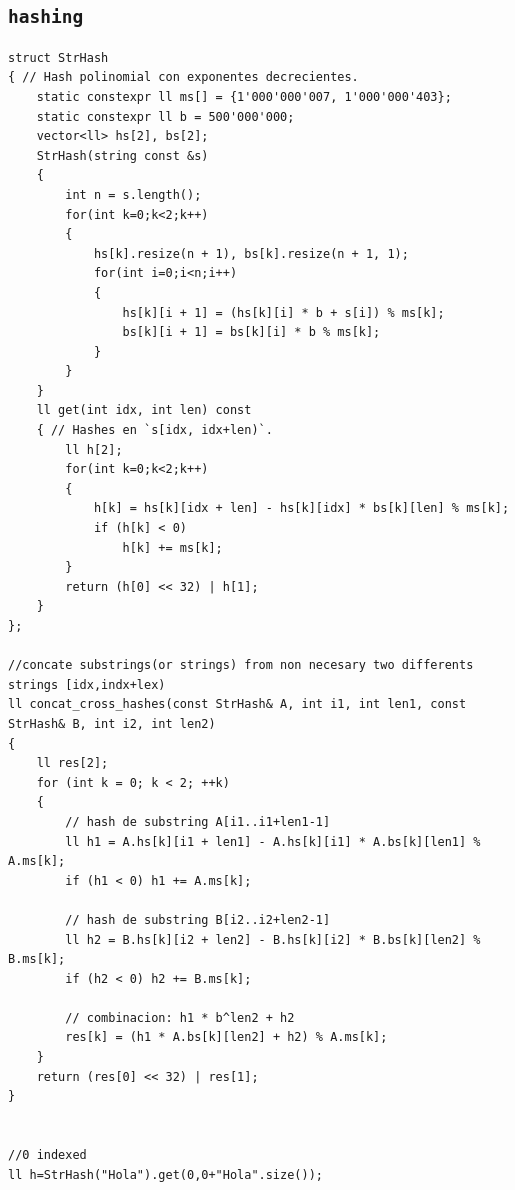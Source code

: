 \subsection{\texttt{hashing}}
\begin{lstlisting}
struct StrHash
{ // Hash polinomial con exponentes decrecientes.
    static constexpr ll ms[] = {1'000'000'007, 1'000'000'403};
    static constexpr ll b = 500'000'000;
    vector<ll> hs[2], bs[2];
    StrHash(string const &s)
    {
        int n = s.length();
        for(int k=0;k<2;k++)
        {
            hs[k].resize(n + 1), bs[k].resize(n + 1, 1);
            for(int i=0;i<n;i++)
            {
                hs[k][i + 1] = (hs[k][i] * b + s[i]) % ms[k];
                bs[k][i + 1] = bs[k][i] * b % ms[k];
            }
        }
    }
    ll get(int idx, int len) const
    { // Hashes en `s[idx, idx+len)`.
        ll h[2];
        for(int k=0;k<2;k++)
        {
            h[k] = hs[k][idx + len] - hs[k][idx] * bs[k][len] % ms[k];
            if (h[k] < 0)
                h[k] += ms[k];
        }
        return (h[0] << 32) | h[1];
    }
};

//concate substrings(or strings) from non necesary two differents strings [idx,indx+lex)
ll concat_cross_hashes(const StrHash& A, int i1, int len1, const StrHash& B, int i2, int len2)
{
    ll res[2];
    for (int k = 0; k < 2; ++k)
    {
        // hash de substring A[i1..i1+len1-1]
        ll h1 = A.hs[k][i1 + len1] - A.hs[k][i1] * A.bs[k][len1] % A.ms[k];
        if (h1 < 0) h1 += A.ms[k];

        // hash de substring B[i2..i2+len2-1]
        ll h2 = B.hs[k][i2 + len2] - B.hs[k][i2] * B.bs[k][len2] % B.ms[k];
        if (h2 < 0) h2 += B.ms[k];

        // combinacion: h1 * b^len2 + h2
        res[k] = (h1 * A.bs[k][len2] + h2) % A.ms[k];
    }
    return (res[0] << 32) | res[1];
}


//0 indexed
ll h=StrHash("Hola").get(0,0+"Hola".size());
\end{lstlisting}

